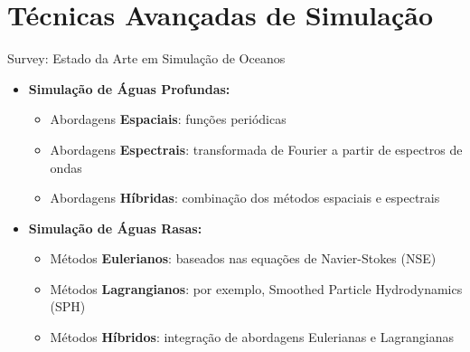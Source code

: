 \documentclass[aspectratio=169,xcolor=table]{beamer}
\begin{document}
\section{Técnicas Avançadas de Simulação}
\begin{frame}{Survey: Estado da Arte em Simulação de Oceanos}
    \begin{itemize}
        \item \textbf{Simulação de Águas Profundas:}
        \begin{itemize}
            \item Abordagens \textbf{Espaciais}: funções periódicas
            \item Abordagens \textbf{Espectrais}: transformada de Fourier a partir de espectros de ondas
            \item Abordagens \textbf{Híbridas}: combinação dos métodos espaciais e espectrais
        \end{itemize}
        \item \textbf{Simulação de Águas Rasas:}
        \begin{itemize}
            \item Métodos \textbf{Eulerianos}: baseados nas equações de Navier-Stokes (NSE)
            \item Métodos \textbf{Lagrangianos}: por exemplo, Smoothed Particle Hydrodynamics (SPH)
            \item Métodos \textbf{Híbridos}: integração de abordagens Eulerianas e Lagrangianas
        \end{itemize}
    \end{itemize}
\end{frame}
\end{document}
